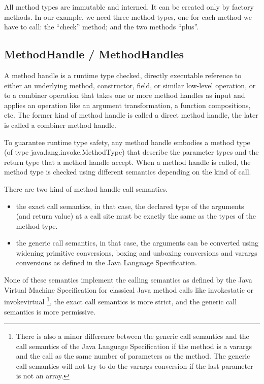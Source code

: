 \documentclass{sig-alternate}
\begin{document}
      

      All method types are immutable and interned.
      It can be created only by factory methods.
      In our example, we need three method types, one for each method we have to call:
      the ``check'' method; and the two methods ``plus''.

      

    \subsection{MethodHandle / MethodHandles}
      \label{MH}

      A method handle is a runtime type checked, directly executable reference to
      either an underlying method, constructor, field, or similar low-level operation,
      or to a combiner operation that takes one or more method handles as input and
      applies an operation like an argument transformation, a function compositions, etc.
      The former kind of method handle is called a direct method handle,
      the later is called a combiner method handle.

      To guarantee runtime type safety, any method handle embodies a method type (of type java.lang.invoke.MethodType)
      that describe the parameter types and the return type that a method handle accept.
      When a method handle is called, the method type is checked using different semantics depending on the
      kind of call.

      There are two kind of method handle call semantics.
      \begin{itemize}
        \item the exact call semantics, in that case, the declared type of the arguments (and return value) at a call site
              must be exactly the same as the types of the method type.
        \item the generic call semantics, in that case, the arguments can be converted using widening primitive conversions,
              boxing and unboxing conversions and varargs conversions as defined in the Java Language Specification.
      \end{itemize}
      None of these semantics implement the calling semantics as defined by the Java Virtual Machine Specification
      for classical Java method calls like invokestatic or invokevirtual
      \footnote{There is also a minor difference between the generic call semantics and the call semantics of
        the Java Language Specification if the method is a varargs and the call as the same number of parameters as the method.
        The generic call semantics will not try to do the varargs conversion if the last parameter is not an array.},
      the exact call semantics is more strict, and the generic call semantics is more permissive.
\end{document}
